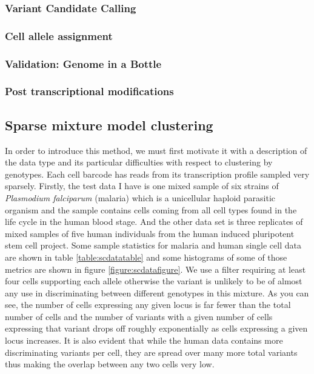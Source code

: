 \subsubsection{Variant Candidate Calling}
\subsubsection{Cell allele assignment}
\subsubsection{Validation: Genome in a Bottle}
\subsubsection{Post transcriptional modifications}




\subsection{Sparse mixture model clustering}
In order to introduce this method, we must first motivate it with a description of the data type and its particular difficulties with respect to clustering by genotypes. Each cell barcode has reads from its transcription profile sampled very sparsely. Firstly, the test data I have is one mixed sample of six strains of \textit{Plasmodium falciparum} (malaria) which is a unicellular haploid parasitic organism and the sample contains cells coming from all cell types found in the life cycle in the human blood stage. And the other data set is three replicates of mixed samples 
of five human individuals from the human induced pluripotent stem cell project. Some sample statistics for malaria 
and human single cell data are shown in table \ref{table:scdatatable} and some histograms of some of those metrics are shown in figure \ref{figure:scdatafigure}. We use a filter 
requiring at least four cells supporting each allele otherwise the variant is unlikely to be of almost any use in discriminating between different genotypes in this mixture. 
As you can see, the number of cells expressing any given locus is far fewer than the total number of cells and the number of variants with a given number of cells expressing that variant drops off roughly exponentially as cells expressing a given locus increases. It is also evident that while the human data contains more discriminating variants per cell, they are spread over many more total variants thus making the overlap between any two cells very low.

